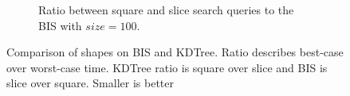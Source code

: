 \begin{figure}[h]
{\begin{subfigure}[b]{0.68\textwidth}
        \caption{Ratio between square and slice search queries to the BIS with $size=100$.}
        \label{fig:bis_ratio_100}
    \end{subfigure}
  }
  \caption{Comparison of shapes on BIS and KDTree. Ratio describes best-case over worst-case time. KDTree ratio is square over slice and BIS is slice over square. Smaller is better}
  \label{fig:kdtree_bis_ratio_100}
  
\end{figure}

\begin{figure}[h]
\end{figure}
